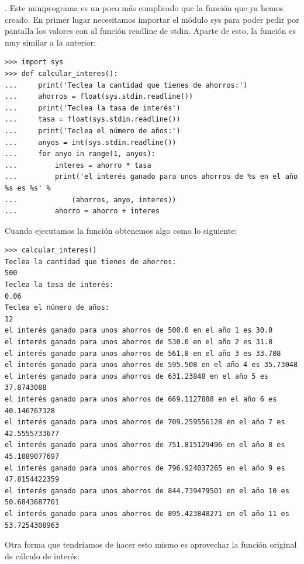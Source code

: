. Este miniprograma es un poco más complicado que la función que ya hemos creado.   En primer lugar necesitamos importar el módulo sys para poder pedir por pantalla los valores con al función readline de stdin.   Aparte de esto, la función es muy similar a la anterior:

\begin{listing}
\begin{verbatim}
>>> import sys
>>> def calcular_interes():
...     print('Teclea la cantidad que tienes de ahorros:')
...     ahorros = float(sys.stdin.readline())
...     print('Teclea la tasa de interés')
...     tasa = float(sys.stdin.readline())
...     print('Teclea el número de años:')
...     anyos = int(sys.stdin.readline())
...     for anyo in range(1, anyos):
...         interes = ahorro * tasa
...         print('el interés ganado para unos ahorros de %s en el año %s es %s' % 
...             (ahorros, anyo, interes))
...         ahorro = ahorro + interes
\end{verbatim}
\end{listing}

\noindent
Cuando ejecutamos la función obtenemos algo como lo siguiente:

\begin{listingignore}
\begin{verbatim}
>>> calcular_interes()
Teclea la cantidad que tienes de ahorros:
500
Teclea la tasa de interés:
0.06
Teclea el número de años:
12
el interés ganado para unos ahorros de 500.0 en el año 1 es 30.0
el interés ganado para unos ahorros de 530.0 en el año 2 es 31.8
el interés ganado para unos ahorros de 561.8 en el año 3 es 33.708
el interés ganado para unos ahorros de 595.508 en el año 4 es 35.73048
el interés ganado para unos ahorros de 631.23848 en el año 5 es 37.8743088
el interés ganado para unos ahorros de 669.1127888 en el año 6 es 40.146767328
el interés ganado para unos ahorros de 709.259556128 en el año 7 es 42.5555733677
el interés ganado para unos ahorros de 751.815129496 en el año 8 es 45.1089077697
el interés ganado para unos ahorros de 796.924037265 en el año 9 es 47.8154422359
el interés ganado para unos ahorros de 844.739479501 en el año 10 es 50.6843687701
el interés ganado para unos ahorros de 895.423848271 en el año 11 es 53.7254308963
\end{verbatim}
\end{listingignore}

\noindent
Otra forma que tendríamos de hacer esto mismo es aprovechar la función original de cálculo de interés:

